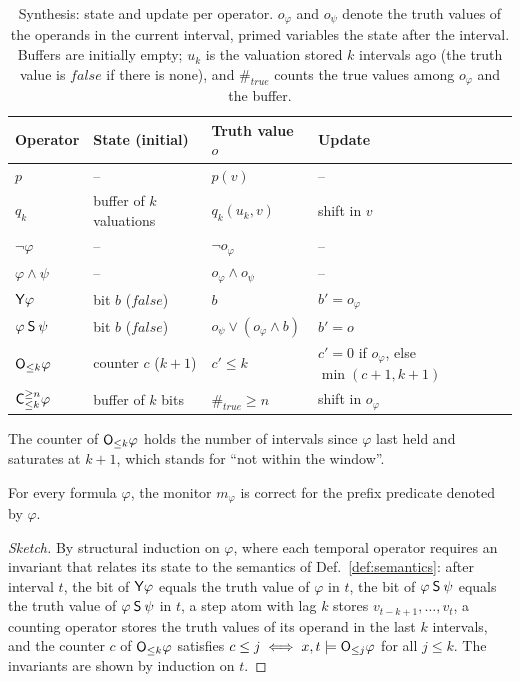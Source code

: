 \begin{table}[t]
  \caption{Synthesis: state and update per operator. $o_\varphi$ and $o_\psi$ denote the truth values of the operands in the current interval, primed variables the state after the interval. Buffers are initially empty; $u_k$ is the valuation stored $k$ intervals ago (the truth value is $\mathit{false}$ if there is none), and $\#_{\mathit{true}}$ counts the true values among $o_\varphi$ and the buffer.}
  \label{tab:synthesis}
  \centering
  \small
  \setlength{\tabcolsep}{4pt}
  \begin{tabular}{@{}llll@{}}
    \toprule
    Operator & State (initial) & Truth value $o$ & Update\\
    \midrule
    $p$ & -- & $p(v)$ & --\\
    $q_k$ & buffer of $k$ valuations & $q_k(u_k, v)$ & shift in $v$\\
    $\lnot\varphi$ & -- & $\lnot o_\varphi$ & --\\
    $\varphi \land \psi$ & -- & $o_\varphi \land o_\psi$ & --\\
    $\Yop\varphi$ & bit $b$ ($\mathit{false}$) & $b$ & $b' = o_\varphi$\\
    $\varphi \Sop \psi$ & bit $b$ ($\mathit{false}$) & $o_\psi \lor (o_\varphi \land b)$ & $b' = o$\\
    $\Owin{k}\varphi$ & counter $c$ ($k+1$) & $c' \leq k$ & $c' = 0$ if $o_\varphi$, else $\min(c{+}1, k{+}1)$\\
    $\Cwin{k}{n}\varphi$ & buffer of $k$ bits & $\#_{\mathit{true}} \geq n$ & shift in $o_\varphi$\\
    \bottomrule
  \end{tabular}
\end{table}

The counter of $\Owin{k}\varphi$ holds the number of intervals since $\varphi$ last held and saturates at $k+1$, which stands for ``not within the window''.

\begin{theorem}\label{thm:synthesis}
  For every formula $\varphi$, the monitor $m_\varphi$ is correct for the prefix predicate denoted by $\varphi$.
\end{theorem}

\begin{proof}[Sketch]
  By structural induction on $\varphi$, where each temporal operator requires an invariant that relates its state to the semantics of Def.~\ref{def:semantics}: after interval $t$, the bit of $\Yop\varphi$ equals the truth value of $\varphi$ in $t$, the bit of $\varphi \Sop \psi$ equals the truth value of $\varphi \Sop \psi$ in $t$, a step atom with lag $k$ stores $v_{t-k+1}, \dots, v_t$, a counting operator stores the truth values of its operand in the last $k$ intervals, and the counter $c$ of $\Owin{k}\varphi$ satisfies $c \leq j \iff x, t \sat \Owin{j}\varphi$ for all $j \leq k$. The invariants are shown by induction on $t$.
\end{proof}

